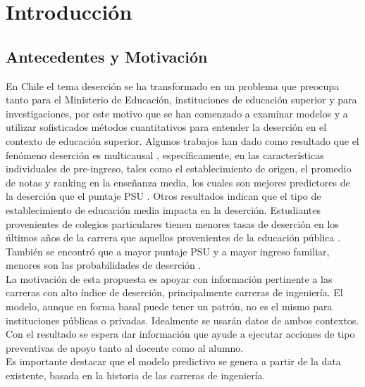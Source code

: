 \chapter[Introducción]{Introducción}
\label{ch:intro}



\section{Antecedentes y Motivación}
\label{sec:motivacion}

En Chile el tema deserción se ha transformado en un problema que preocupa tanto para el Ministerio de Educación, instituciones de educación superior y para investigaciones, por este motivo que se han comenzado a examinar modelos y a utilizar sofisticados métodos cuantitativos para entender la deserción en el contexto de educación superior. Algunos trabajos han dado como resultado que el fenómeno deserción es multicausal \cite{acuna}, específicamente, en las características individuales de pre-ingreso, tales como el establecimiento de origen, el promedio de notas y ranking en la enseñanza media, los cuales son mejores predictores de la deserción que el puntaje PSU  \cite{larroucau}. Otros resultados indican que el tipo de establecimiento de educación media impacta en la deserción. Estudiantes provenientes de colegios particulares tienen menores tasas de deserción en los últimos años de la carrera que aquellos provenientes de la educación pública \cite{celis}. También se encontró que a mayor puntaje PSU y a mayor ingreso familiar, menores son las probabilidades de deserción \cite{diaz}. \\

La motivación de esta propuesta es apoyar con información pertinente a las carreras con alto índice de deserción, principalmente carreras de ingeniería. El modelo, aunque en forma basal puede tener un patrón, no es el mismo para instituciones públicas o privadas. Idealmente se usarán datos de ambos contextos. Con el resultado se espera dar información que ayude a ejecutar acciones de tipo preventivas de apoyo tanto al docente como al alumno.\\ 

Es importante destacar que el modelo predictivo se genera a partir de la data existente, basada en la historia de las carreras de ingeniería.\\






